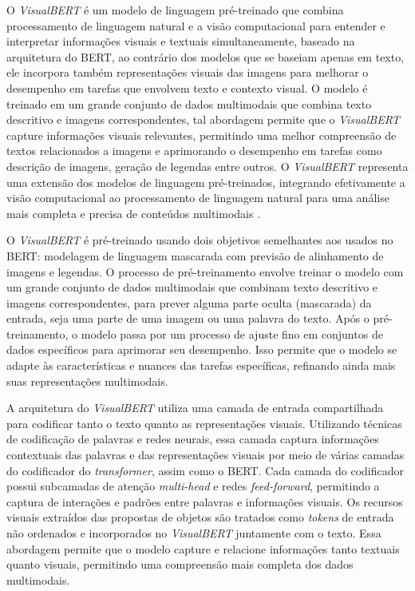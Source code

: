 O \textit{VisualBERT} é um modelo de linguagem pré-treinado que combina processamento de linguagem natural e a visão computacional para entender e interpretar informações visuais e textuais simultaneamente, baseado na arquitetura do BERT, ao contrário dos modelos que se baseiam apenas em texto, ele incorpora também representações visuais das imagens para melhorar o desempenho em tarefas que envolvem texto e contexto visual. O modelo é treinado em um grande conjunto de dados multimodais que combina texto descritivo e imagens correspondentes, tal abordagem permite que o \textit{VisualBERT} capture informações visuais relevantes, permitindo uma melhor compreensão de textos relacionados a imagens e aprimorando o desempenho em tarefas como descrição de imagens, geração de legendas entre outros. O \textit{VisualBERT} representa uma extensão dos modelos de linguagem pré-treinados, integrando efetivamente a visão computacional ao processamento de linguagem natural para uma análise mais completa e precisa de conteúdos multimodais \cite{VisualBERTArt}.

O \textit{VisualBERT} é pré-treinado usando dois objetivos semelhantes aos usados no BERT: modelagem de linguagem mascarada com previsão de alinhamento de imagens e legendas. O processo de pré-treinamento envolve treinar o modelo com um grande conjunto de dados multimodais que combinam texto descritivo e imagens correspondentes, para prever alguma parte oculta (mascarada) da entrada, seja uma parte de uma imagem ou uma palavra do texto. Após o pré-treinamento, o modelo passa por um processo de ajuste fino em conjuntos de dados específicos para aprimorar seu desempenho. Isso permite que o modelo se adapte às características e nuances das tarefas específicas, refinando ainda mais suas representações multimodais.

A arquitetura do \textit{VisualBERT} utiliza uma camada de entrada compartilhada para codificar tanto o texto quanto as representações visuais. Utilizando técnicas de codificação de palavras e redes neurais, essa camada captura informações contextuais das palavras e das representações visuais por meio de várias camadas do codificador do \textit{transformer}, assim como o BERT. Cada camada do codificador possui subcamadas de atenção \textit{multi-head} e redes \textit{feed-forward}, permitindo a captura de interações e padrões entre palavras e informações visuais. Os recursos visuais extraídos das propostas de objetos são tratados como \textit{tokens} de entrada não ordenados e incorporados no \textit{VisualBERT} juntamente com o texto. Essa abordagem permite que o modelo capture e relacione informações tanto textuais quanto visuais, permitindo uma compreensão mais completa dos dados multimodais.

